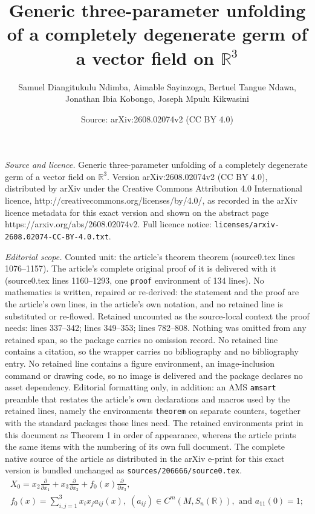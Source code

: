 \documentclass[10pt,a4paper]{amsart}
\title{Generic three-parameter unfolding of a completely degenerate germ of a vector field on $\mathbb{R}^3$}
\author{Samuel Diangitukulu Ndimba, Aimable Sayinzoga, Bertuel Tangue Ndawa, Jonathan Ibia Kobongo, Joseph Mpulu Kikwasini}
\date{Source: arXiv:2608.02074v2 (CC BY 4.0)}
\begin{document}
\maketitle

\noindent\emph{Source and licence.} Generic three-parameter unfolding of a completely degenerate germ of a vector field on $\mathbb{R}^3$. Version arXiv:2608.02074v2 (CC BY 4.0), distributed by arXiv under the Creative Commons Attribution 4.0 International licence, http://creativecommons.org/licenses/by/4.0/, as recorded in the arXiv licence metadata for this exact version and shown on the abstract page https://arxiv.org/abs/2608.02074v2. Full licence notice: \texttt{licenses/arxiv-2608.02074-CC-BY-4.0.txt}.\par\smallskip

\noindent\textit{Editorial scope.} Counted unit: the article's theorem theorem (source0.tex lines 1076--1157). The article's complete original proof of it is delivered with it (source0.tex lines 1160--1293, one \texttt{proof} environment of 134 lines). No mathematics is written, repaired or re-derived: the statement and the proof are the article's own lines, in the article's own notation, and no retained line is substituted or re-flowed.  Retained uncounted as the source-local context the proof needs: lines 337--342; lines 349--353; lines 782--808.  Nothing was omitted from any retained span, so the package carries no omission record.  No retained line contains a citation, so the wrapper carries no bibliography and no bibliography entry.  No retained line contains a figure environment, an image-inclusion command or drawing code, so no image is delivered and the package declares no asset dependency.  Editorial formatting only, in addition: an AMS \texttt{amsart} preamble that restates the article's own declarations and macros used by the retained lines, namely the environments \texttt{theorem} on separate counters, together with the standard packages those lines need.  The retained environments print in this document as Theorem 1 in order of appearance, whereas the article prints the same items with the numbering of its own full document.  The complete native source of the article as distributed in the arXiv e-print for this exact version is bundled unchanged as \texttt{sources/206666/source0.tex}.
\begin{equation}\label{GSUH1}\tag{H1}
\begin{array}{l}
X_0=x_2\frac{\partial}{\partial x_1}+x_3\frac{\partial}{\partial x_2} + f_0 (x)\frac{\partial}{\partial x_3},
 \\f_0(x) = \sum_{i,j=1}^{3} x_i x_j a_{ij}(x),\; (a_{ij})\in C^m(M, S_n(\mathbb{R})),\mbox{ and } a_{11}(0)=1;
\end{array}
\end{equation}
\end{document}
